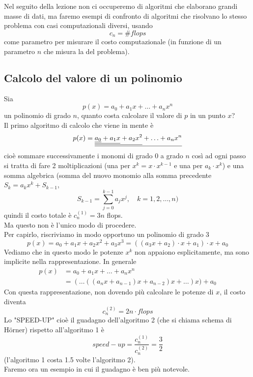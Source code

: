 \documentclass[12pt]{article}
\begin{document}
\bigskip
Nel seguito della lezione non ci occuperemo di algoritmi che elaborano grandi masse di dati, ma faremo esempi di confronto di algoritmi che risolvano lo stesso problema con casi computazionali diversi, usando \[c_n = \# flops\] come parametro per misurare il costo computazionale (in funzione di un parametro $n$ che misura la  del problema). 

\subsection{Calcolo del valore di un polinomio}
Sia
\[p(x) = a_0 + a_1x + \dotsc + a_nx^n\]
un polinomio di grado $n$, quanto costa calcolare il valore di $p$ in un punto $x$? \\
Il primo algoritmo di calcolo che viene in mente è 
\[p(x) = \uline{\uline{\uline{\uline{a_0} + a_1x} + a_2x^2} + \dotsc + a_nx^n}\]
cioè sommare successivamente i monomi di grado 0 a grado $n$ così ad ogni passo si tratta di fare 2 moltiplicazioni (una per $x^k = x \cdot x^{k-1}$ e una per $a_k\cdot x^k$) e una somma algebrica (somma del nuovo monomio alla somma precedente $S_k = a_k x^k + S_{k-1}$, 
\[S_{k-1}=\sum_{j=0}^{k-1} a_j x^j,\quad k = 1,2,\dotsc,n)\]
quindi il costo totale è $c^{(1)}_{n} = 3n$ flops. \\
Ma questo non è l'unico modo di procedere.\\
Per capirlo, riscriviamo in modo opportuno un polinomio di grado 3
\[p(x) = a_0 + a_1x + a_2 x^2 + a_3 x^3 = ((a_3 x + a_2) \cdot x + a_1) \cdot x + a_0 \]
Vediamo che in questo modo le potenze $x^k$ non appaiono esplicitamente, ma sono implicite nella rappresentazione. In generale
\[\begin{split}
    p(x) & = a_0 + a_1x + \dotsc + a_nx^n \\
    & = (\dotsc((a_n x + a_{n-1}) x + a_{n-2}) x + \dotsc) x) + a_0 
\end{split}\]
Con questa rappresentazione, non dovendo più calcolare le potenze di $x$, il costo diventa
\[ c_n^{(2)}=2n\cdot flops \]
Lo "SPEED-UP" cioè il guadagno dell'algoritmo 2 (che si chiama schema di H\"orner) rispetto all'algoritmo 1 è
\[speed-up=\frac{c_n^{(1)}}{c_n^{(2)}}=\frac{3}{2}\]
(l'algoritmo 1 costa 1.5 volte l'algoritmo 2).\\ 
Faremo ora un esempio in cui il guadagno è ben più notevole.\newline
\end{document}
